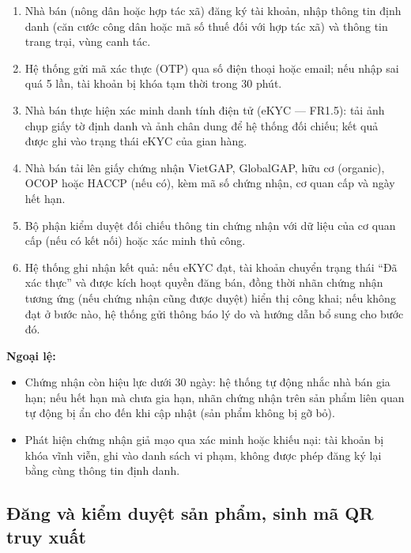 \begin{enumerate}
    \item Nhà bán (nông dân hoặc hợp tác xã) đăng ký tài khoản, nhập thông tin định danh (căn cước công dân hoặc mã số thuế đối với hợp tác xã) và thông tin trang trại, vùng canh tác.
    \item Hệ thống gửi mã xác thực (OTP) qua số điện thoại hoặc email; nếu nhập sai quá 5 lần, tài khoản bị khóa tạm thời trong 30 phút.
    \item Nhà bán thực hiện xác minh danh tính điện tử (eKYC --- FR1.5): tải ảnh chụp giấy tờ định danh và ảnh chân dung để hệ thống đối chiếu; kết quả được ghi vào trạng thái eKYC của gian hàng.
    \item Nhà bán tải lên giấy chứng nhận VietGAP, GlobalGAP, hữu cơ (organic), OCOP hoặc HACCP (nếu có), kèm mã số chứng nhận, cơ quan cấp và ngày hết hạn.
    \item Bộ phận kiểm duyệt đối chiếu thông tin chứng nhận với dữ liệu của cơ quan cấp (nếu có kết nối) hoặc xác minh thủ công.
    \item Hệ thống ghi nhận kết quả: nếu eKYC đạt, tài khoản chuyển trạng thái ``Đã xác thực'' và được kích hoạt quyền đăng bán, đồng thời nhãn chứng nhận tương ứng (nếu chứng nhận cũng được duyệt) hiển thị công khai; nếu không đạt ở bước nào, hệ thống gửi thông báo lý do và hướng dẫn bổ sung cho bước đó.
\end{enumerate}

\textbf{Ngoại lệ:}
\begin{itemize}
    \item Chứng nhận còn hiệu lực dưới 30 ngày: hệ thống tự động nhắc nhà bán gia hạn; nếu hết hạn mà chưa gia hạn, nhãn chứng nhận trên sản phẩm liên quan tự động bị ẩn cho đến khi cập nhật (sản phẩm không bị gỡ bỏ).
    \item Phát hiện chứng nhận giả mạo qua xác minh hoặc khiếu nại: tài khoản bị khóa vĩnh viễn, ghi vào danh sách vi phạm, không được phép đăng ký lại bằng cùng thông tin định danh.
\end{itemize}



\subsection{Đăng và kiểm duyệt sản phẩm, sinh mã QR truy xuất}

